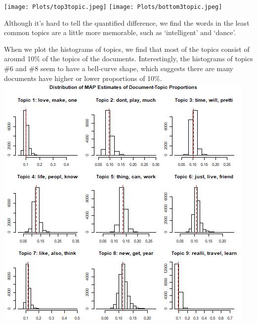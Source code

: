 \documentclass[]{article}
\begin{document}
\texttt{[image: Plots/top3topic.jpeg]}
\texttt{[image: Plots/bottom3topic.jpeg]}

Although it's hard to tell the quantified difference, we find the words
in the least common topics are a little more memorable, such as
`intelligent' and `dance'.

When we plot the histograms of topics, we find that most of the topics
consist of around 10\% of the topics of the documents. Interestingly,
the histograms of topics \#6 and \#8 seem to have a bell-curve shape,
which suggests there are many documents have higher or lower proportions
of 10\%. \includegraphics{Plots/hist.jpeg}
\end{document}
